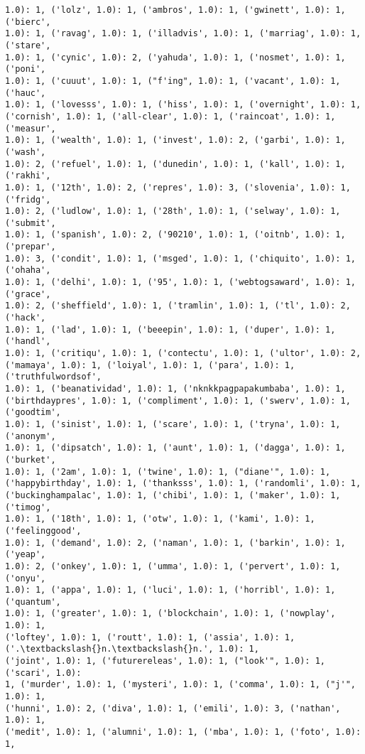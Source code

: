 \documentclass[11pt]{article}
\begin{document}
\begin{Verbatim}[commandchars=\\\{\}]
1.0): 1, ('lolz', 1.0): 1, ('ambros', 1.0): 1, ('gwinett', 1.0): 1, ('bierc',
1.0): 1, ('ravag', 1.0): 1, ('illadvis', 1.0): 1, ('marriag', 1.0): 1, ('stare',
1.0): 1, ('cynic', 1.0): 2, ('yahuda', 1.0): 1, ('nosmet', 1.0): 1, ('poni',
1.0): 1, ('cuuut', 1.0): 1, ("f'ing", 1.0): 1, ('vacant', 1.0): 1, ('hauc',
1.0): 1, ('lovesss', 1.0): 1, ('hiss', 1.0): 1, ('overnight', 1.0): 1,
('cornish', 1.0): 1, ('all-clear', 1.0): 1, ('raincoat', 1.0): 1, ('measur',
1.0): 1, ('wealth', 1.0): 1, ('invest', 1.0): 2, ('garbi', 1.0): 1, ('wash',
1.0): 2, ('refuel', 1.0): 1, ('dunedin', 1.0): 1, ('kall', 1.0): 1, ('rakhi',
1.0): 1, ('12th', 1.0): 2, ('repres', 1.0): 3, ('slovenia', 1.0): 1, ('fridg',
1.0): 2, ('ludlow', 1.0): 1, ('28th', 1.0): 1, ('selway', 1.0): 1, ('submit',
1.0): 1, ('spanish', 1.0): 2, ('90210', 1.0): 1, ('oitnb', 1.0): 1, ('prepar',
1.0): 3, ('condit', 1.0): 1, ('msged', 1.0): 1, ('chiquito', 1.0): 1, ('ohaha',
1.0): 1, ('delhi', 1.0): 1, ('95', 1.0): 1, ('webtogsaward', 1.0): 1, ('grace',
1.0): 2, ('sheffield', 1.0): 1, ('tramlin', 1.0): 1, ('tl', 1.0): 2, ('hack',
1.0): 1, ('lad', 1.0): 1, ('beeepin', 1.0): 1, ('duper', 1.0): 1, ('handl',
1.0): 1, ('critiqu', 1.0): 1, ('contectu', 1.0): 1, ('ultor', 1.0): 2,
('mamaya', 1.0): 1, ('loiyal', 1.0): 1, ('para', 1.0): 1, ('truthfulwordsof',
1.0): 1, ('beanatividad', 1.0): 1, ('nknkkpagpapakumbaba', 1.0): 1,
('birthdaypres', 1.0): 1, ('compliment', 1.0): 1, ('swerv', 1.0): 1, ('goodtim',
1.0): 1, ('sinist', 1.0): 1, ('scare', 1.0): 1, ('tryna', 1.0): 1, ('anonym',
1.0): 1, ('dipsatch', 1.0): 1, ('aunt', 1.0): 1, ('dagga', 1.0): 1, ('burket',
1.0): 1, ('2am', 1.0): 1, ('twine', 1.0): 1, ("diane'", 1.0): 1,
('happybirthday', 1.0): 1, ('thanksss', 1.0): 1, ('randomli', 1.0): 1,
('buckinghampalac', 1.0): 1, ('chibi', 1.0): 1, ('maker', 1.0): 1, ('timog',
1.0): 1, ('18th', 1.0): 1, ('otw', 1.0): 1, ('kami', 1.0): 1, ('feelinggood',
1.0): 1, ('demand', 1.0): 2, ('naman', 1.0): 1, ('barkin', 1.0): 1, ('yeap',
1.0): 2, ('onkey', 1.0): 1, ('umma', 1.0): 1, ('pervert', 1.0): 1, ('onyu',
1.0): 1, ('appa', 1.0): 1, ('luci', 1.0): 1, ('horribl', 1.0): 1, ('quantum',
1.0): 1, ('greater', 1.0): 1, ('blockchain', 1.0): 1, ('nowplay', 1.0): 1,
('loftey', 1.0): 1, ('routt', 1.0): 1, ('assia', 1.0): 1, ('.\textbackslash{}n.\textbackslash{}n.', 1.0): 1,
('joint', 1.0): 1, ('futurereleas', 1.0): 1, ("look'", 1.0): 1, ('scari', 1.0):
1, ('murder', 1.0): 1, ('mysteri', 1.0): 1, ('comma', 1.0): 1, ("j'", 1.0): 1,
('hunni', 1.0): 2, ('diva', 1.0): 1, ('emili', 1.0): 3, ('nathan', 1.0): 1,
('medit', 1.0): 1, ('alumni', 1.0): 1, ('mba', 1.0): 1, ('foto', 1.0): 1,

\end{Verbatim}
\end{document}
